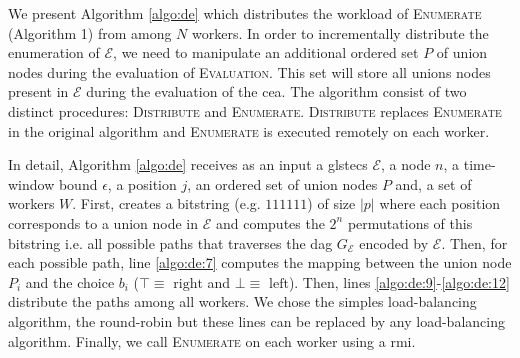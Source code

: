 \setlength{\interspacetitleruled}{-.4pt}%
\begin{algorithm}[H]
  \DontPrintSemicolon
  \SetAlgoNoEnd %
  \SetAlgoNoLine %
  \LinesNotNumbered
  \nl {}
\label{algo:enumerate}
\end{algorithm}

We present Algorithm \ref{algo:de} which distributes the workload of \textsc{Enumerate} (Algorithm 1) from \cite{core} among $N$ workers. In order to incrementally distribute the enumeration of $\mathcal{E}$, we need to manipulate an additional ordered set $P$ of union nodes during the evaluation of \textsc{Evaluation}. This set will store all unions nodes present in $\mathcal{E}$ during the evaluation of the \gls{cea}. The algorithm consist of two distinct procedures: \textsc{Distribute} and \textsc{Enumerate}. \textsc{Distribute} replaces \textsc{Enumerate} in the original algorithm and \textsc{Enumerate} is executed remotely on each worker.

In detail, Algorithm \ref{algo:de} receives as an input a gls{tecs} $\mathcal{E}$, a node $n$, a time-window bound $\epsilon$, a position $j$, an ordered set of union nodes $P$ and, a set of workers $W$. First, creates a bitstring (e.g. $111111$) of size $|p|$ where each position corresponds to a union node in $\mathcal{E}$ and computes the $2^{n}$ permutations of this bitstring i.e. all possible paths that traverses the \gls{dag} $G_{\mathcal{E}}$ encoded by $\mathcal{E}$. Then, for each possible path, line \ref{algo:de:7} computes the mapping between the union node $P_{i}$ and the choice $b_{i}$ ($\top \equiv \text{ right}$ and $\bot \equiv \text{ left}$). Then, lines \ref{algo:de:9}-\ref{algo:de:12} distribute the paths among all workers. We chose the simples load-balancing algorithm, the round-robin but these lines can be replaced by any load-balancing algorithm. Finally, we call \textsc{Enumerate} on each worker using a \gls{rmi}.

